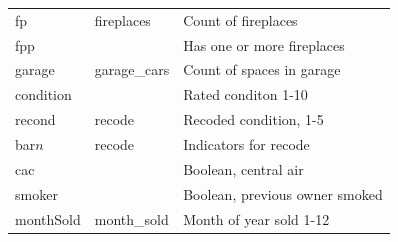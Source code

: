 \documentclass[twocolumn,11pt]{article}
\begin{document}
\begin{table}[scale=0.4]
\begin{tabular}{lll}
fp         & fireplaces         & Count of fireplaces \\
fpp        &                    & Has one or more fireplaces \\
garage     & garage\_cars       & Count of spaces in garage \\
\hline
condition  &                    & Rated conditon 1-10 \\
recond     & recode             & Recoded condition, 1-5 \\
bar$n$     & recode             & Indicators for recode \\
cac        &                    & Boolean, central air \\
smoker     &                    & Boolean, previous owner smoked \\
monthSold  & month\_sold        & Month of year sold 1-12 \\
\hline
\end{tabular}
\end{table}

\end{document}

